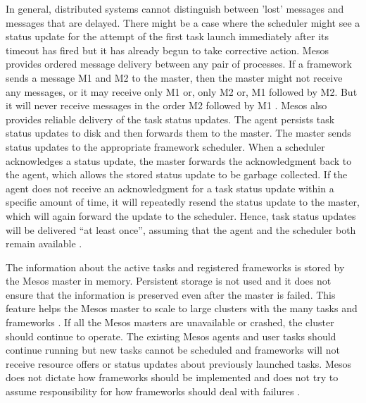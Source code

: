 \documentclass[9pt,twocolumn,twoside]{../../styles/osajnl}
\begin{document}
In general, distributed systems cannot distinguish between 'lost'
messages and messages that are delayed. There might be a case where
the scheduler might see a status update for the attempt of the first
task launch immediately after its timeout has fired but it has already
begun to take corrective action.  Mesos provides ordered message
delivery between any pair of processes. If a framework sends a message
M1 and M2 to the master, then the master might not receive any
messages, or it may receive only M1 or, only M2 or, M1 followed by
M2. But it will never receive messages in the order M2 followed by M1
\cite{www-mesos-frmwrk}.  Mesos also provides reliable delivery of the
task status updates.  The agent persists task status updates to disk
and then forwards them to the master.  The master sends status updates
to the appropriate framework scheduler.  When a scheduler acknowledges
a status update, the master forwards the acknowledgment back to the
agent, which allows the stored status update to be garbage
collected. If the agent does not receive an acknowledgment for a task
status update within a specific amount of time, it will repeatedly
resend the status update to the master, which will again forward the
update to the scheduler. Hence, task status updates will be delivered
``at least once'', assuming that the agent and the scheduler both
remain available \cite{www-mesos-frmwrk}.

The information about the active tasks and registered frameworks is
stored by the Mesos master in memory.  Persistent storage is not used
and it does not ensure that the information is preserved even after
the master is failed.  This feature helps the Mesos master to scale to
large clusters with the many tasks and frameworks
\cite{www-mesos-frmwrk}.  If all the Mesos masters are unavailable or
crashed, the cluster should continue to operate.  The existing Mesos
agents and user tasks should continue running but new tasks cannot be
scheduled and frameworks will not receive resource offers or status
updates about previously launched tasks. Mesos does not dictate how
frameworks should be implemented and does not try to assume
responsibility for how frameworks should deal with failures
\cite{www-mesos-frmwrk}.
\end{document}
